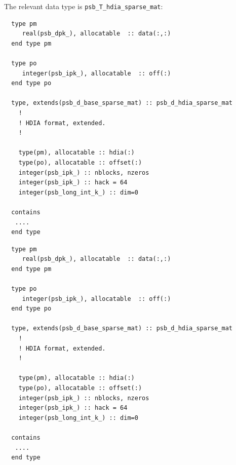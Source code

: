The relevant data type is \verb|psb_T_hdia_sparse_mat|:
\ifpdf
\begin{verbatim}
  type pm
     real(psb_dpk_), allocatable  :: data(:,:)
  end type pm

  type po
     integer(psb_ipk_), allocatable  :: off(:)
  end type po

  type, extends(psb_d_base_sparse_mat) :: psb_d_hdia_sparse_mat
    !
    ! HDIA format, extended.
    !
    
    type(pm), allocatable :: hdia(:)
    type(po), allocatable :: offset(:)
    integer(psb_ipk_) :: nblocks, nzeros
    integer(psb_ipk_) :: hack = 64
    integer(psb_long_int_k_) :: dim=0

  contains
   ....
  end type
\end{verbatim}
\else
\begin{center}
    \begin{minipage}[tl]{0.9\textwidth}
\begin{verbatim} 
  type pm
     real(psb_dpk_), allocatable  :: data(:,:)
  end type pm

  type po
     integer(psb_ipk_), allocatable  :: off(:)
  end type po

  type, extends(psb_d_base_sparse_mat) :: psb_d_hdia_sparse_mat
    !
    ! HDIA format, extended.
    !
    
    type(pm), allocatable :: hdia(:)
    type(po), allocatable :: offset(:)
    integer(psb_ipk_) :: nblocks, nzeros
    integer(psb_ipk_) :: hack = 64
    integer(psb_long_int_k_) :: dim=0

  contains
   ....
  end type
\end{verbatim}
    \end{minipage}
  \end{center}
\fi


